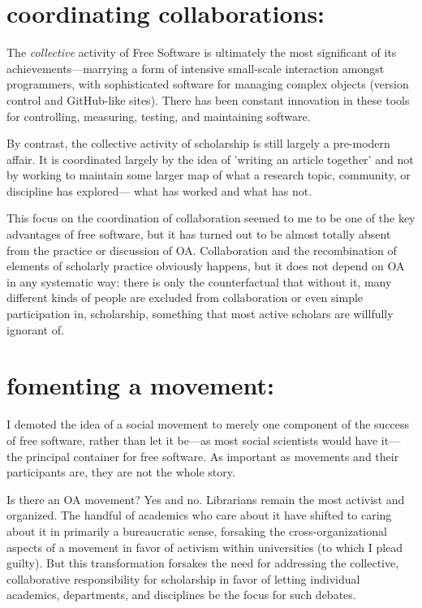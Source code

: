 \documentclass[11pt]{report}
\begin{document}
\section*{\textbf{coordinating collaborations}:}
\label{sec:orgc143f04}

The \emph{collective} activity of Free Software is ultimately the most significant of its achievements---marrying a form of intensive small-scale interaction amongst programmers, with sophisticated software for managing complex objects (version control and GitHub-like sites).  There has been constant innovation in these tools for controlling, measuring, testing, and maintaining software.

By contrast, the collective activity of scholarship is still largely a pre-modern affair.  It is coordinated largely by the idea of 'writing an article together' and not by working to maintain some larger map of what a research topic, community, or discipline has explored--- what has worked and what has not. 

This focus on the coordination of collaboration seemed to me to be one of the key advantages of free software, but it has turned out to be almost totally absent from the practice or discussion of OA.  Collaboration and the recombination of elements of scholarly practice obviously happens, but it does not depend on OA in any systematic way: there is only the counterfactual that without it, many different kinds of people are excluded from collaboration or even simple participation in, scholarship, something that most active scholars are willfully ignorant of.

\section*{\textbf{fomenting a movement}:}
\label{sec:org6daedfe}

I demoted the idea of a social movement to merely one component of the success of free software, rather than let it be---as most social scientists would have it---the principal container for free software.  As important as movements and their participants are, they are not the whole story.

Is there an OA movement?  Yes and no.  Librarians remain the most activist and organized.  The handful of academics who care about it have shifted to caring about it in primarily a bureaucratic sense, forsaking the cross-organizational aspects of a movement in favor of activism within universities (to which I plead guilty).  But this transformation forsakes the need for addressing the collective, collaborative responsibility for scholarship in favor of letting individual academics, departments, and disciplines be the focus for such debates. 
\end{document}
